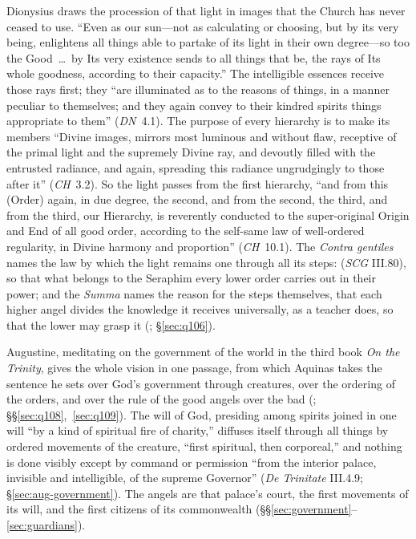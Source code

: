 Dionysius draws the procession of that light in images that the Church has
never ceased to use. ``Even as our sun---not as calculating or choosing, but
by its very being, enlightens all things able to partake of its light in
their own degree---so too the Good~\dots\ by Its very existence sends to all
things that be, the rays of Its whole goodness, according to their
capacity.'' The intelligible essences receive those rays first; they ``are
illuminated as to the reasons of things, in a manner peculiar to themselves;
and they again convey to their kindred spirits things appropriate to them''
(\emph{DN}~4.1). The purpose of every hierarchy is to make its members
``Divine images, mirrors most luminous and without flaw, receptive of the
primal light and the supremely Divine ray, and devoutly filled with the
entrusted radiance, and again, spreading this radiance ungrudgingly to those
after it'' (\emph{CH}~3.2). So the light passes from the first hierarchy,
``and from this (Order) again, in due degree, the second, and from the
second, the third, and from the third, our Hierarchy, is reverently conducted
to the super-original Origin and End of all good order, according to the
self-same law of well-ordered regularity, in Divine harmony and proportion''
(\emph{CH}~10.1). The \emph{Contra gentiles} names the law by which the
light remains one through all its steps:  (\emph{SCG} III.80), so that what belongs to the
Seraphim every lower order carries out in their power; and the \emph{Summa}
names the reason for the steps themselves, that each higher angel divides
the knowledge it receives universally, as a teacher does, so that the lower
may grasp it (; \S\ref{sec:q106}).

Augustine, meditating on the government of the world in the third book
\emph{On the Trinity}, gives the whole vision in one passage, from which
Aquinas takes the sentence he sets over God's government through creatures,
over the ordering of the orders, and over the rule of the good angels over
the bad (; \S\S\ref{sec:q108},~\ref{sec:q109}).
The will of God, presiding among spirits joined in one will ``by a kind of
spiritual fire of charity,'' diffuses itself through all things by ordered
movements of the creature, ``first spiritual, then corporeal,'' and nothing
is done visibly except by command or permission ``from the interior palace,
invisible and intelligible, of the supreme Governor'' (\emph{De Trinitate}
III.4.9; \S\ref{sec:aug-government}). The angels
are that palace's court, the first movements of its will, and the
first citizens of its commonwealth
(\S\S\ref{sec:government}--\ref{sec:guardians}).

